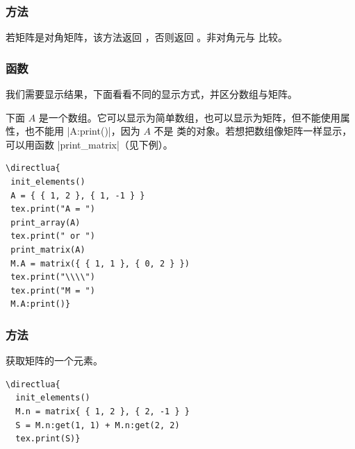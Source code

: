 \subsubsection{方法 }
\label{ssub:method_is_diagonal}

若矩阵是对角矩阵，该方法返回 ，否则返回 。非对角元与  比较。

\subsubsection{函数 }
\label{ssub:display_a_table_or_array_function_code_print_array}

我们需要显示结果，下面看看不同的显示方式，并区分数组与矩阵。

下面 $A$ 是一个数组。它可以显示为简单数组，也可以显示为矩阵，但不能使用属性，也不能用 |A:print()|，因为 $A$ 不是  类的对象。若想把数组像矩阵一样显示，可以用函数 |print_matrix|（见下例）。

\vspace{.5em}
\begin{minipage}{.5\textwidth}
\begin{verbatim}
\directlua{
 init_elements()
 A = { { 1, 2 }, { 1, -1 } }
 tex.print("A = ")
 print_array(A)
 tex.print(" or ")
 print_matrix(A)
 M.A = matrix({ { 1, 1 }, { 0, 2 } })
 tex.print("\\\\")
 tex.print("M = ")
 M.A:print()}
\end{verbatim}
\end{minipage}
 \begin{minipage}{.5\textwidth}
 \end{minipage}

\subsubsection{方法 }
\label{ssub:get_an_element_of_a_matrix}
获取矩阵的一个元素。


\begin{minipage}{.5\textwidth}
\begin{verbatim}
\directlua{
  init_elements()
  M.n = matrix{ { 1, 2 }, { 2, -1 } }
  S = M.n:get(1, 1) + M.n:get(2, 2)
  tex.print(S)}
\end{verbatim}
\end{minipage}
\begin{minipage}{.5\textwidth}
\end{minipage}

